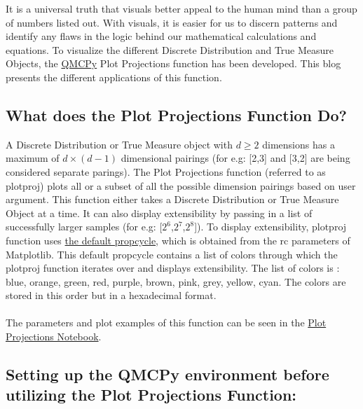 It is a universal truth that visuals better appeal to the human mind than a group of numbers listed out. With visuals, it is easier for us to discern patterns and identify any flaws in the logic behind our mathematical calculations and equations. To visualize the different Discrete Distribution and True Measure Objects, the \href{https://qmcpy.org/}{QMCPy} Plot Projections function has been developed. This blog presents the different applications of this function.

\subsection*{What does the Plot Projections Function Do?}
A Discrete Distribution or True Measure object with $d \geq 2$ dimensions has a maximum of $d\times(d -1)$ 
dimensional pairings (for e.g: [2,3] and [3,2] are being considered separate parings). The Plot Projections function (referred to as plot\textunderscore proj) plots all or a subset of all the possible dimension pairings based on user argument. This function either takes a Discrete Distribution or True Measure Object at a time. It can also display extensibility by passing in a list of successfully larger samples (for e.g: [$2^{6}$,$2^{7}$,$2^{8}$]). 
 To display extensibility, plot\textunderscore proj function uses \href{https://matplotlib.org/stable/gallery/color/color_cycle_default.html}{the default prop\textunderscore cycle}, which is obtained from the rc parameters of Matplotlib. This default prop\textunderscore cycle contains a list of colors through which the plot\textunderscore proj function iterates over and displays extensibility. The list of colors is : blue, orange, green, red, purple, brown, pink, grey, yellow, cyan. The colors are stored in this order but in a hexadecimal format.
 \\\\ The parameters and plot examples of this function can be seen in the \href{https://github.com/QMCSoftware/QMCSoftware/blob/master/demos/plot_proj_function.ipynb}{Plot Projections Notebook}.
\subsection*{Setting up the QMCPy environment before utilizing the Plot Projections Function:}
 
